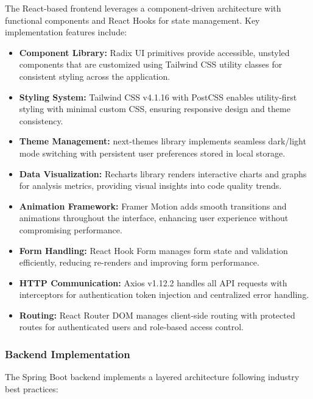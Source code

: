 \documentclass[12pt,a4paper]{article}
\begin{document}
    The React-based frontend leverages a component-driven architecture with functional components and React Hooks for state management. Key implementation features include:

    \begin{itemize}[leftmargin=0.5in]
        \item \textbf{Component Library:} Radix UI primitives provide accessible, unstyled components that are customized using Tailwind CSS utility classes for consistent styling across the application.
        \item \textbf{Styling System:} Tailwind CSS v4.1.16 with PostCSS enables utility-first styling with minimal custom CSS, ensuring responsive design and theme consistency.
        \item \textbf{Theme Management:} next-themes library implements seamless dark/light mode switching with persistent user preferences stored in local storage.
        \item \textbf{Data Visualization:} Recharts library renders interactive charts and graphs for analysis metrics, providing visual insights into code quality trends.
        \item \textbf{Animation Framework:} Framer Motion adds smooth transitions and animations throughout the interface, enhancing user experience without compromising performance.
        \item \textbf{Form Handling:} React Hook Form manages form state and validation efficiently, reducing re-renders and improving form performance.
        \item \textbf{HTTP Communication:} Axios v1.12.2 handles all API requests with interceptors for authentication token injection and centralized error handling.
        \item \textbf{Routing:} React Router DOM manages client-side routing with protected routes for authenticated users and role-based access control.
    \end{itemize}

    \subsubsection{Backend Implementation}

    The Spring Boot backend implements a layered architecture following industry best practices:
\end{document}
